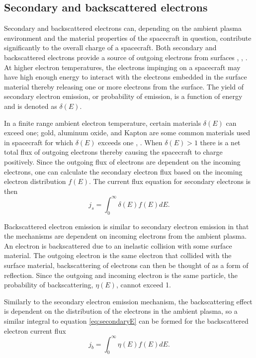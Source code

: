 \subsection*{Secondary and backscattered electrons}
Secondary and backscattered electrons can, depending on the ambient plasma environment and the material properties of the spacecraft in question, contribute significantly to the overall charge of a spacecraft. Both secondary and backscattered electrons provide a source of outgoing electrons from surfaces \parencite{LAI2019}, \parencite{Lai2005}, \parencite{Miloch2015}. At higher electron temperatures, the electrons impinging on a spacecraft may have high enough energy to interact with the electrons embedded in the surface material thereby releasing one or more electrons from the surface. The yield of secondary electron emission, or probability of emission, is a function of energy and is denoted as $\delta(E)$. 

In a finite range ambient electron temperature, certain materials $\delta(E)$ can exceed one; gold, aluminum oxide, and Kapton are some common materials used in spacecraft for which $\delta(E)$ exceeds one \parencite{Lai2006}, \parencite{LAI2019}. When $\delta(E) > 1$ there is a net total flux of outgoing electrons thereby causing the spacecraft to charge positively. Since the outgoing flux of electrons are dependent on the incoming electrons, one can calculate the secondary electron flux based on the incoming electron distribution $f(E)$. The current flux equation for secondary electrons is then
\begin{equation}\label{eq:secondaryE}
    j_s = \int^{\infty}_0 \delta(E) f(E) dE.
\end{equation}

Backscattered electron emission is similar to secondary electron emission in that the mechanisms are dependent on incoming electrons from the ambient plasma. An electron is backscattered due to an inelastic collision with some surface material. The outgoing electron is the same electron that collided with the surface material, backscattering of electrons can then be thought of as a form of reflection. Since the outgoing and incoming electron is the same particle, the probability of backscattering, $\eta(E)$, cannot exceed 1. 

Similarly to the secondary electron emission mechanism, the backscattering effect is dependent on the distribution of the electrons in the ambient plasma, so a similar integral to equation \eqref{eq:secondaryE} can be formed for the backscattered electron current flux 
\begin{equation}\label{eq:backscatterE}
    j_b = \int^{\infty}_0 \eta(E) f(E) dE.
\end{equation}

